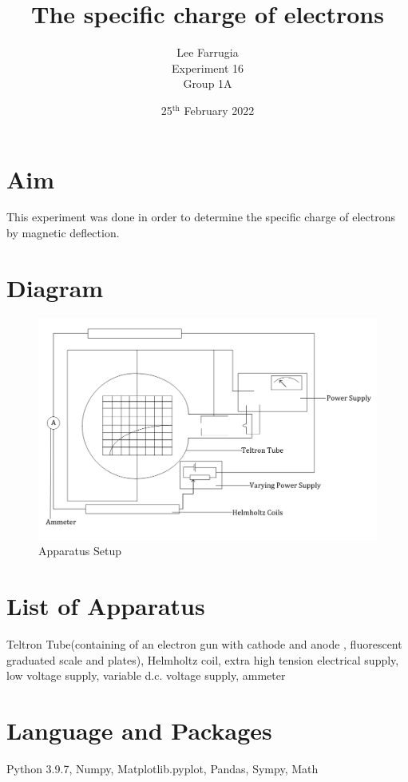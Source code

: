 \documentclass[12pt, a4paper]{article}
\title{The specific charge of electrons}
\author{Lee Farrugia \\ Experiment 16 \\ Group 1A}
\date{25$^{\text{th}}$ February 2022}
\begin{document}
\maketitle
\thispagestyle{titlepagestyle}
\pagestyle{mystyle}

\section*{Aim}
This experiment was done in order to determine the specific charge of electrons by magnetic deflection.

\section*{Diagram}
\begin{figure}[H]
    \centering
    \includegraphics[width=\textwidth]{Experiment 16 diagram.png}
    \caption{Apparatus Setup}
    \label{fig:Set up}
\end{figure}

\section*{List of Apparatus}
Teltron Tube(containing of an electron gun with cathode  and anode , fluorescent graduated scale and plates), Helmholtz coil, extra high tension electrical supply, low voltage supply, variable d.c. voltage supply, ammeter

\section*{Language and Packages}
Python 3.9.7, Numpy, Matplotlib.pyplot, Pandas, Sympy, Math
\end{document}
